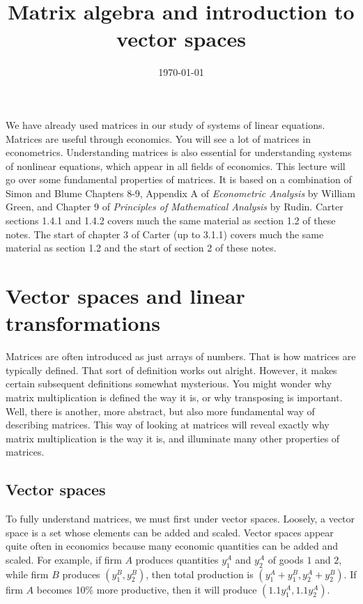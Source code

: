 \documentclass[12pt,reqno]{amsart}
\title{Matrix algebra and introduction to vector spaces}
\date{\today}
\theoremstyle{definition}
\begin{document}
\maketitle

We have already used matrices in our study of systems of linear
equations. Matrices are useful through economics. You will see a lot
of matrices in econometrics. Understanding matrices is also essential
for understanding systems of nonlinear equations, which appear in all
fields of economics. This lecture will go over some fundamental
properties of matrices. It is based on a combination of Simon and
Blume Chapters 8-9, Appendix A of \textit{Econometric Analysis} by
William Green, and Chapter 9 of \textit{Principles of Mathematical
  Analysis} by Rudin. Carter sections 1.4.1 and 1.4.2 covers much the
same material as section 1.2 of these notes. The start of chapter 3 of
Carter (up to 3.1.1) covers much the same material as section 1.2 and
the start of section 2 of these notes. 


\section{Vector spaces and linear transformations}

Matrices are often introduced as just arrays of numbers.  That is how
matrices are typically defined. That sort of definition works out
alright. However, it makes certain subsequent definitions somewhat
mysterious. You might wonder why matrix multiplication is defined the
way it is, or why transposing is important.  Well, there is another,
more abstract, but also more fundamental way of describing
matrices. This way of looking at matrices will reveal exactly why
matrix multiplication is the way it is, and illuminate many other
properties of matrices. 

\subsection{Vector spaces}

To fully understand matrices, we must first under vector
spaces. Loosely, a vector space is a set whose elements can be added
and scaled. Vector spaces appear quite often in economics because many
economic quantities can be added and scaled. For example, if firm $A$
produces quantities $y_1^A$ and $y_2^A$ of goods  $1$ and $2$, while
firm $B$ produces $(y_1^B,y_2^B)$, then total production is
$(y_1^A+y_1^B, y_2^A+y_2^B)$. If firm $A$ becomes 10\% more
productive, then it will produce $(1.1 y_1^A, 1.1 y_2^A)$. 
\end{document}
